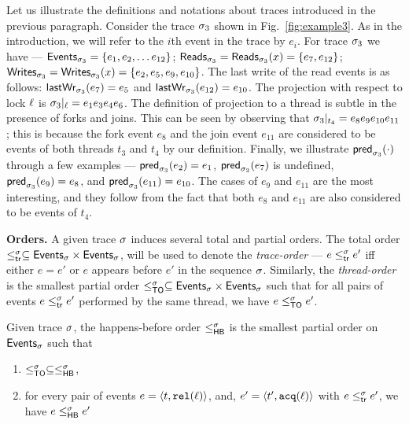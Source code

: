 

\begin{example}
\label{ex:trace-defn}
Let us illustrate the definitions and notations about traces
introduced in the previous paragraph. Consider the trace $\sigma_3$ shown
in Fig.~\ref{fig:example3}. As in the introduction, we will refer to
the $i$th event in the trace by $e_i$. For trace $\sigma_3$ we have ---
$\mathsf{Events}_{\sigma_3} = \{e_1,e_2,\ldots e_{12}\}$; $\mathsf{Reads}_{\sigma_3}
= \mathsf{Reads}_{\sigma_3}(x) = \{e_7,e_{12}\}$; $\mathsf{Writes}_{\sigma_3}
= \mathsf{Writes}_{\sigma_3}(x) = \{e_2,e_5,e_9,e_{10}\}$. The last write of the
read events is as follows: $\mathsf{lastWr}_{\sigma_3}(e_7) = e_5$ and
$\mathsf{lastWr}_{\sigma_3}(e_{12}) = e_{10}$. The projection with respect to lock
$\ell$ is $\sigma_3|_{\ell} = e_1e_3e_4e_6$. The definition of
projection to a thread is subtle in the presence of forks and
joins. This can be seen by observing that $\sigma_3|_{t_4} =
e_8e_9e_{10}e_{11}$; this is because the fork event $e_8$ and the join
event $e_{11}$ are considered to be events of both threads $t_3$ and
$t_4$ by our definition. Finally, we illustrate $\mathsf{pred}_{\sigma_3}(\cdot)$
through a few examples --- $\mathsf{pred}_{\sigma_3}(e_2) = e_1$,
$\mathsf{pred}_{\sigma_3}(e_7)$ is undefined, $\mathsf{pred}_{\sigma_3}(e_9) = e_8$, and
$\mathsf{pred}_{\sigma_3}(e_{11}) = e_{10}$. The cases of $e_9$ and $e_{11}$ are
the most interesting, and they follow from the fact that both $e_8$
and $e_{11}$ are also considered to be events of $t_4$.
\end{example}

\vspace*{0.1in}
\noindent
{\bf Orders.}  A given trace $\sigma$ induces several total and partial
orders.  The total order
$\leq^{\sigma}_{\mathsf{tr}} \subseteq \mathsf{Events}_{\sigma} \times \mathsf{Events}_{\sigma}$, will be used
to denote the \emph{trace-order} --- $e \leq^{\sigma}_{\mathsf{tr}} e'$ iff either $e
= e'$ or $e$ appears before $e'$ in the sequence $\sigma$.  Similarly,
the \emph{thread-order} is the smallest partial order
$\leq^{\sigma}_{\mathsf{TO}} \subseteq \mathsf{Events}_{\sigma} \times \mathsf{Events}_{\sigma}$ such that for
all pairs of events $e \leq^{\sigma}_{\mathsf{tr}} e'$ performed by the same thread,
we have $e \leq^{\sigma}_{\mathsf{TO}} e'$.
%
\begin{definition}
\label{def:hb}
Given trace $\sigma$, the happens-before order $\leq^{\sigma}_{\mathsf{HB}}$ is the smallest
partial order on $\mathsf{Events}_{\sigma}$ such that 
\begin{enumerate}[label=(\alph*)]
\item $\leq^{\sigma}_{\mathsf{TO}} \subseteq \leq^{\sigma}_{\mathsf{HB}}$, 
\item for every pair of events $e = \langle t, \mathtt{rel}(\ell)\rangle$, and,
$e' = \langle t', \mathtt{acq}(\ell)\rangle$ with
$e \leq^{\sigma}_{\mathsf{tr}} e'$, we have $e \leq^{\sigma}_{\mathsf{HB}} e'$
%
%
\end{enumerate}
\end{definition}


